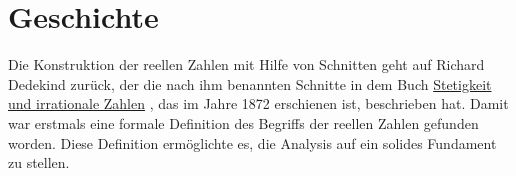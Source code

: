 \section{Geschichte}
Die Konstruktion der reellen
Zahlen mit Hilfe von Schnitten geht auf Richard Dedekind zurück, der die nach ihm benannten Schnitte in dem Buch
\href{http://books.google.de/books?id=n-43AAAAMAAJ&printsec=frontcover&source=gbs_ge_summary_r&cad=0#v=onepage&q&f=false}{Stetigkeit und irrationale Zahlen} 
\cite{dedekind:1872}, das im Jahre 1872 erschienen ist, beschrieben hat.  Damit war erstmals eine
formale Definition des Begriffs der reellen Zahlen gefunden worden.  Diese Definition 
ermöglichte es, die Analysis auf ein solides Fundament zu stellen.


